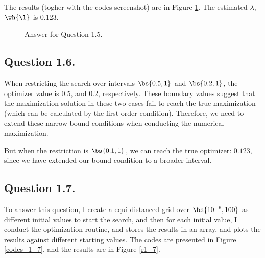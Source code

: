 \documentclass[12pt]{article}
\theoremstyle{definition}
\begin{document}
The results (togher with the codes screenshot) are in Figure \ref{r1_5}. The estimated $\lambda$, $\wh{\l}$ is 0.123. 

\begin{figure}[H]
    \noindent\caption{Answer for Question 1.5.}
    \begin{center}
        \label{r1_5}
    \end{center}
\end{figure}

\subsection{Question 1.6.}

When restricting the search over intervals $\bs{0.5, 1}$ and $\bs{0.2,1}$, the optimizer value is $0.5$, and $0.2$, respectively. These boundary values suggest that the maximization solution in these two cases fail to reach the true maximization (which can be calculated by the first-order condition). Therefore, we need to extend these narrow bound conditions when conducting the numerical maximization. 

But when the restriction is $\bs{0.1, 1}$, we can reach the true optimizer: $0.123$, since we have extended our bound condition to a broader interval.

\subsection{Question 1.7.}

To answer this question, I create a equi-distanced grid over $\bs{10^{-6}, 100}$ as different initial values to start the search, and then for each initial value, I conduct the optimization routine, and stores the results in an array, and plots the results against different starting values. The codes are presented in Figure \ref{codes_1_7}, and the results are in Figure \ref{r1_7}.
\end{document}
